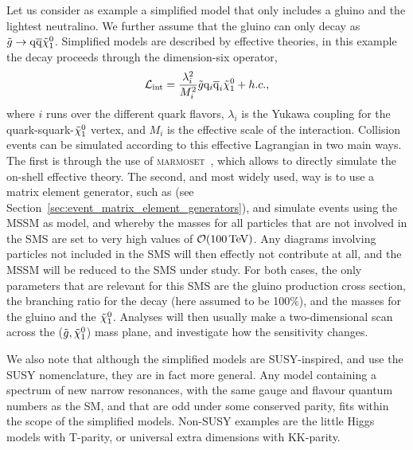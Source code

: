 Let us consider as example a simplified model that only includes a gluino and the lightest
neutralino. We further assume that the gluino can only decay as $\tilde{g}\rightarrow \mathrm{q} \overline{\mathrm{q}}
\tilde{\chi}_1^0$. Simplified models are described by effective theories, in this example the decay
proceeds through the dimension-six operator, 
\begin{equation}
  \mathcal{L}_{\text{int}} = \frac{\lambda_i^2}{M_i^2} \tilde{g} \mathrm{q}_i \overline{\mathrm{q}}_i \tilde{\chi}_1^0 + h.c. , 
\end{equation}
where $i$ runs over the different quark flavors, $\lambda_i$ is the Yukawa coupling for the
quark-squark-$\tilde{\chi}_1^0$ vertex, and $M_i$ is the effective scale of the interaction. 
Collision events can be simulated according to this effective Lagrangian in two main ways. The
first is through the use of \textsc{marmoset}~\cite{ArkaniHamed:2007fw}, which allows to directly
simulate the on-shell effective theory. The second, and most widely used, way is to use a matrix
element generator, such as \MADGRAPH (see Section~\ref{sec:event_matrix_element_generators}), and
simulate events using the MSSM as model, and whereby the masses for all particles that are not
involved in the SMS are set to very high values of $\mathcal{O}(100\,\text{Te\hspace{-.08em}V})$.
Any diagrams involving particles not included in the SMS will then effectly not contribute at
all, and the MSSM will be reduced to the SMS under study.  
For both cases, the only parameters that are relevant for this SMS are the gluino production cross
section, the branching ratio for the decay (here assumed to be 100\%), and the masses for the gluino
and the $\tilde{\chi}_1^0$. Analyses will then usually make a two-dimensional scan across the
($\tilde{g},\tilde{\chi}_1^0$) mass plane, and investigate how the sensitivity changes.


We also note that although the simplified models are SUSY-inspired, and use the SUSY nomenclature,
they are in fact more general. Any model containing a spectrum of new narrow resonances, with the
same gauge and flavour quantum numbers as the SM, and that are odd under some conserved parity, fits
within the scope of the simplified models. Non-SUSY examples are the little Higgs models with
T-parity, or universal extra dimensions with KK-parity. 



 